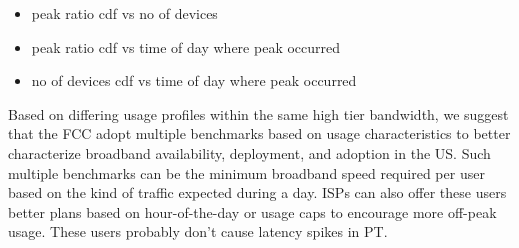 
\begin{itemize}
\itemsep0em
\item peak ratio cdf vs no of devices
\item peak ratio cdf vs time of day where peak occurred
\item no of devices cdf vs time of day where peak occurred
\end{itemize}

Based on differing usage profiles within the same high tier bandwidth, we suggest that the FCC adopt multiple benchmarks based on usage characteristics to better characterize broadband availability, deployment, and adoption in the US. Such multiple benchmarks can be the minimum broadband speed required per user based on the kind of traffic expected during a day. ISPs can also offer these users better plans based on hour-of-the-day or usage caps to encourage more off-peak usage. These users probably don't cause latency spikes in PT.
